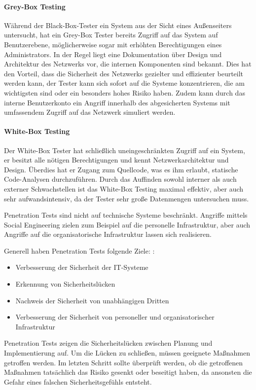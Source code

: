 \documentclass[12pt,oneside,a4paper,parskip,pointlessnumbers]{scrbook}
\begin{document}
    \paragraph{Grey-Box Testing}
    Während der Black-Box-Tester ein System aus der Sicht eines Außenseiters untersucht, hat ein    Grey-Box Tester bereits Zugriff auf das System auf Benutzerebene, möglicherweise sogar mit erhöhten Berechtigungen eines Administrators. In der Regel liegt eine Dokumentation über Design und Architektur des Netzwerks vor, die internen Komponenten sind bekannt. Dies hat den Vorteil, dass die Sicherheit des Netzwerks gezielter und effizienter beurteilt werden kann, der Tester kann sich sofort auf die Systeme konzentrieren, die am wichtigsten sind oder ein besonders hohes Risiko haben. Zudem kann durch das interne Benutzerkonto ein Angriff innerhalb des abgesicherten Systems mit umfassendem Zugriff auf das Netzwerk simuliert werden.
    \paragraph{White-Box Testing}
    Der White-Box Tester hat schließlich uneingeschränkten Zugriff auf ein System, er besitzt alle nötigen Berechtigungen und kennt Netzwerkarchitektur und Design. Überdies hat er Zugang zum Quellcode, was es ihm erlaubt, statische Code-Analysen durchzuführen. Durch das Auffinden sowohl interner als auch externer Schwachstellen ist das White-Box Testing maximal effektiv, aber auch sehr aufwandsintensiv, da der Tester sehr große Datenmengen untersuchen muss.

    Penetration Tests sind nicht auf technische Systeme beschränkt. Angriffe mittels Social Engineering zielen zum Beispiel auf die personelle Infrastruktur, aber auch Angriffe auf die organisatorische Infrastruktur lassen sich realisieren\cite{BSI}.

    Generell haben Penetration Tests folgende Ziele: \cite{BSI}:
    \begin{itemize}
      \item Verbesserung der Sicherheit der IT-Systeme
      \item Erkennung von Sicherheitslücken
      \item Nachweis der Sicherheit von unabhängigen Dritten
      \item Verbesserung der Sicherheit von personeller und organisatorischer Infrastruktur
    \end{itemize}
    Penetration Tests zeigen die Sicherheitslücken zwischen Planung und Implementierung auf. Um die Lücken zu schließen, müssen geeignete Maßnahmen getroffen werden. Im letzten Schritt sollte überprüft werden, ob die getroffenen Maßnahmen tatsächlich das Risiko gesenkt oder beseitigt haben, da ansonsten die Gefahr eines falschen Sicherheitsgefühls entsteht. \cite{BSI}
    \newpage
\end{document}
